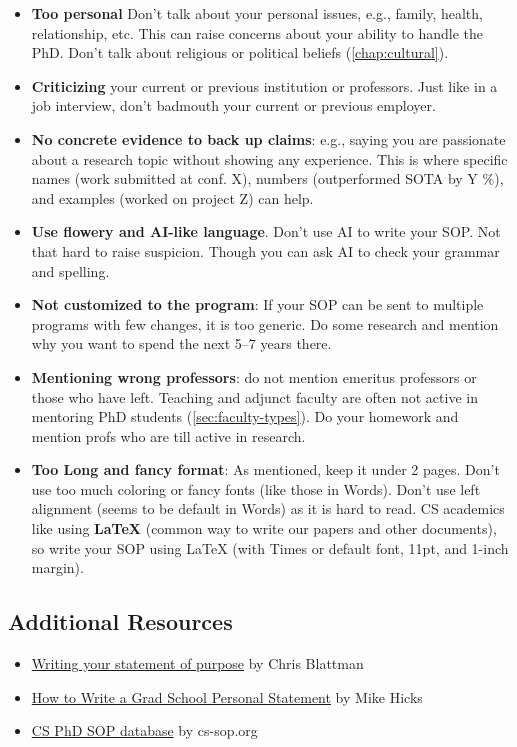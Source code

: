 \documentclass[oneside,11pt,dvipsnames]{book}
\begin{document}
\begin{itemize}
\item \textbf{Too personal} Don't talk about your personal issues, e.g., family, health, relationship, etc. This can raise concerns about your ability to handle the PhD. Don't talk about religious or political beliefs (\autoref{chap:cultural}).
\item \textbf{Criticizing} your current or previous institution or professors. Just like in a job interview, don't badmouth your current or previous employer. 
\item \textbf{No concrete evidence to back up claims}: e.g., saying you are passionate about a research topic without showing any experience. This is where specific names (work submitted at conf. X), numbers (outperformed SOTA by Y \%), and examples (worked on project Z) can help. 
\item \textbf{Use flowery and AI-like language}. Don't use AI to write your SOP. Not that hard to raise suspicion. Though you can ask AI to check your grammar and spelling.
\item \textbf{Not customized to the program}: If your SOP can be sent to multiple programs with few changes, it is too generic. Do some research and mention why you want to spend the next 5--7 years there.
\item \textbf{Mentioning wrong professors}: do not mention emeritus professors or those who have left.  Teaching and adjunct faculty are often not active in mentoring PhD students (\autoref{sec:faculty-types}). Do your homework and mention profs who are till active in research. 
\item \textbf{Too Long and fancy format}: As mentioned, keep it under 2 pages. Don't use too much coloring or fancy fonts (like those in Words). Don't use left alignment (seems to be default in Words) as it is hard to read.
CS academics like using \textbf{LaTeX} (common way to write our papers and other documents), so write your SOP using LaTeX (with Times or default font, 11pt, and 1-inch margin).
\end{itemize}


\subsection*{Additional Resources}
\begin{itemize}
    \item \href{https://chrisblattman.com/blog/2022/01/11/}{Writing your statement of purpose} by Chris Blattman
  \item \href{http://www.pl-enthusiast.net/2022/10/03/how-to-write-a-grad-school-personal-statement/}{How to Write a Grad School Personal Statement} by Mike Hicks
  \item     \href{https://cs-sop.notion.site/cs-sop/CS-PhD-Statements-of-Purpose-df39955313834889b7ac5411c37b958d?p=f5d5980a71524ebaa4e6ae57266b847c&pm=s}{CS PhD SOP database} by cs-sop.org
\end{itemize}
\end{document}
